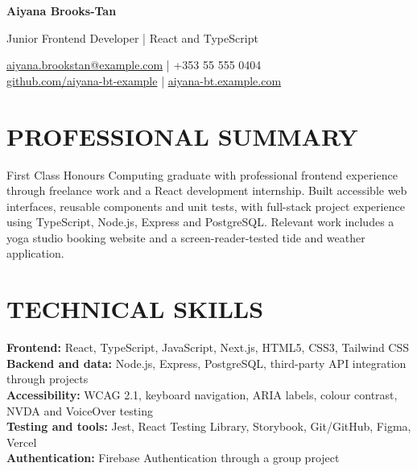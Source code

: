 \documentclass[11pt,a4paper]{article}
\newcommand{\cvsection}[1]{\section*{#1}}
\begin{document}
{\LARGE\bfseries\color{primarycolor} Aiyana Brooks-Tan}\par
{\large\color{accentcolor} Junior Frontend Developer | React and TypeScript}\par
\href{mailto:aiyana.brookstan@example.com}{aiyana.brookstan@example.com} | +353 55 555 0404\\
\href{https://github.com/aiyana-bt-example}{github.com/aiyana-bt-example} | \href{https://aiyana-bt.example.com}{aiyana-bt.example.com}

\cvsection{PROFESSIONAL SUMMARY}
First Class Honours Computing graduate with professional frontend experience through freelance work and a React development internship. Built accessible web interfaces, reusable components and unit tests, with full-stack project experience using TypeScript, Node.js, Express and PostgreSQL. Relevant work includes a yoga studio booking website and a screen-reader-tested tide and weather application.

\cvsection{TECHNICAL SKILLS}
\textbf{Frontend:} React, TypeScript, JavaScript, Next.js, HTML5, CSS3, Tailwind CSS\\
\textbf{Backend and data:} Node.js, Express, PostgreSQL, third-party API integration through projects\\
\textbf{Accessibility:} WCAG 2.1, keyboard navigation, ARIA labels, colour contrast, NVDA and VoiceOver testing\\
\textbf{Testing and tools:} Jest, React Testing Library, Storybook, Git/GitHub, Figma, Vercel\\
\textbf{Authentication:} Firebase Authentication through a group project
\end{document}

